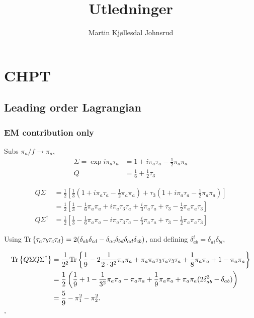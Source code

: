 \documentclass{book}
\title{\huge{Utledninger}}
\author{
    \large{Martin Kjøllesdal Johnsrud }
    }
\begin{document}
\maketitle
\setlength{\parindent}{0em}
\setlength{\parskip}{0.8em}


\chapter{CHPT}
\section{Leading order Lagrangian}

\subsection{EM contribution only}
Subs $\pi_a / f \rightarrow \pi_a$,
\begin{align}
    \Sigma = \exp{i \pi_a \tau_a}
    & = 1 + i\pi_a\tau_a - \frac{1}{2}\pi_a \pi_a \\
    Q 
    & = \frac{1}{6} + \frac{1}{2} \tau_3
\end{align}

\begin{align}
    Q\Sigma 
    & = 
    \frac{1}{2}
    \left[
        \frac{1}{3} 
        \left(
            1 + i\pi_a\tau_a - \frac{1}{2}\pi_a \pi_a
        \right)
        +
        \tau_3
        \left(
            1 + i\pi_a\tau_a - \frac{1}{2}\pi_a \pi_a
        \right)
    \right] \\
    & = 
    \frac{1}{2}
    \left[
        \frac{1}{3} 
        - \frac{1}{6}\pi_a \pi_a
        + i \pi_a \tau_3 \tau_a
        + \frac{i}{3}  \pi_a \tau_a
        + \tau_3
        - \frac{1}{2}\pi_a \pi_a \tau_3 
    \right] \\
    Q \Sigma^\dagger
    & = 
    \frac{1}{2}
    \left[
        \frac{1}{3} 
        - \frac{1}{6}\pi_a \pi_a
        - i \pi_a \tau_3 \tau_a
        - \frac{i}{3}  \pi_a \tau_a
        +\tau_3
        - \frac{1}{2}\pi_a \pi_a \tau_3 
    \right] 
\end{align}


Using $
\text{Tr} \left\{ \tau_a \tau_b \tau_c \tau_d \right\} = 2 (\delta_{ab}\delta_{cd}
 - \delta_{ac}\delta_{bd}
 \delta_{ad}\delta_{cb})
$, and defining $\delta_{ab}^i = \delta_{ai}\delta_{bi}$,

\begin{align}
    \text{Tr} \left\{ Q \Sigma Q \Sigma^\dagger \right\}
    & =
    \frac{1}{2^2}
    \text{Tr} \left\{ 
        \frac{1}{9}
        - 2 \frac{1}{2\cdot 3^2} \pi_a \pi_a
        + \pi_a \pi_a \tau_3 \tau_a\tau_3 \tau_a
        + \frac{1}{8} \pi_a \pi_a
        + 1
        - \pi_a\pi_a
     \right\} \\
    & = 
    \frac{1}{2}
    \left(
        \frac{1}{9}
        + 1
        - \frac{1}{3^2} \pi_a \pi_a
        - \pi_a \pi_a
        + \frac{1}{9} \pi_a \pi_a
        + \pi_a \pi_a(2 \delta_{ab}^3 - \delta_{ab})
    \right) \\
    &
    = \frac{5}{9} - \pi_1^2 - \pi_2^2.
\end{align}'
\end{document}
